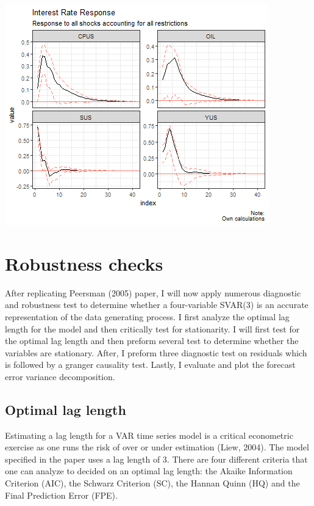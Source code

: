 \documentclass[11pt,preprint, authoryear]{elsarticle}
\let\origfigure\figure
\let\endorigfigure\endfigure
\renewenvironment{figure}[1][2] {
    \expandafter\origfigure\expandafter[H]
} {
    \endorigfigure
}
\numberwithin{equation}{section}
\numberwithin{figure}{section}
\numberwithin{table}{section}
\begin{document}
\begin{figure}[H]

{\centering \includegraphics{replication_files/figure-latex/Figure5-1} 

}

\caption{Interest Rate Response\label{Figure5}}\label{fig:Figure5}
\end{figure}

\hypertarget{robustness-checks}{%
\section{Robustness checks}\label{robustness-checks}}

After replicating Peersman (2005) paper, I will now apply numerous
diagnostic and robustness test to determine whether a four-variable
SVAR(3) is an accurate representation of the data generating process. I
first analyze the optimal lag length for the model and then critically
test for stationarity. I will first test for the optimal lag length and
then preform several test to determine whether the variables are
stationary. After, I preform three diagnostic test on residuals which is
followed by a granger causality test. Lastly, I evaluate and plot the
forecast error variance decomposition.

\hypertarget{optimal-lag-length}{%
\subsection{Optimal lag length}\label{optimal-lag-length}}

Estimating a lag length for a VAR time series model is a critical
econometric exercise as one runs the risk of over or under estimation
(Liew, 2004). The model specified in the paper uses a lag length of 3.
There are four different criteria that one can analyze to decided on an
optimal lag length: the Akaike Information Criterion (AIC), the Schwarz
Criterion (SC), the Hannan Quinn (HQ) and the Final Prediction Error
(FPE).
\end{document}
